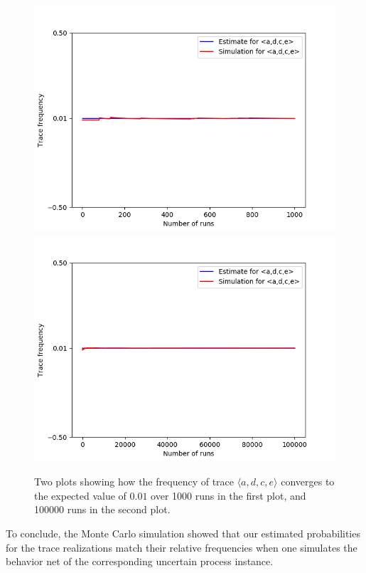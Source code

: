 \begin{figure}%
    \centering
    {{\includegraphics[width=12cm]{figures/adce1.png} }}%
    \qquad
    {{\includegraphics[width=12cm]{figures/adce100.png} }}%
    \caption{Two plots showing how the frequency of trace $\langle a,d,c,e \rangle$ converges to the expected value of $0.01$ over 1000 runs in the first plot, and 100000 runs in the second plot.}%
    \label{fig: adce}%
\end{figure}
%
%
%
%
%
To conclude, the Monte Carlo simulation showed that our estimated probabilities for the trace realizations match their relative frequencies when one simulates the behavior net of the corresponding uncertain process instance.

